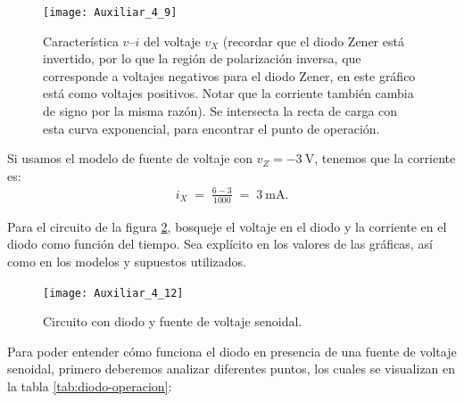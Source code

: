 \documentclass[
  11pt,
  letterpaper,
   addpoints,
   answers
  ]{exam}
\begin{document}
\begin{questions}
\begin{solution}
\begin{figure}[H]
  \centering
  \texttt{[image: Auxiliar\_4\_9]}
  \caption{Característica $v$--$i$ del voltaje $v_X$ (recordar que el diodo Zener está invertido, por lo que la región de polarización inversa, que corresponde a voltajes negativos para el diodo Zener, en este gráfico está como voltajes positivos. Notar que la corriente también cambia de signo por la misma razón). Se intersecta la recta de carga con esta curva exponencial, para encontrar el punto de operación.}

  \label{fig:iv-diodo}
\end{figure}
Si usamos el modelo de fuente de voltaje con \(v_Z = -3~\text{V}\), tenemos que la corriente es:
\begin{align}
i_X \;=\; \frac{6 -3 }{1000} \;=\; 3~\text{mA}.
\end{align}
\end{solution}
\question Para el circuito de la figura \ref{fig:3}, bosqueje el voltaje en el diodo y la corriente en el diodo como función del tiempo. Sea explícito en los valores de las gráficas, así como en los modelos y supuestos utilizados.
\begin{figure}[H]
  \centering
\texttt{[image: Auxiliar\_4\_12]}
  \caption{Circuito con diodo y fuente de voltaje senoidal.}
  \label{fig:3}
\end{figure}
\begin{solution}
Para poder entender cómo funciona el diodo en presencia de una fuente de voltaje senoidal, primero deberemos analizar diferentes puntos, los cuales se visualizan en la tabla \ref{tab:diodo-operacion}:


\end{solution}
\end{questions}
\end{document}
